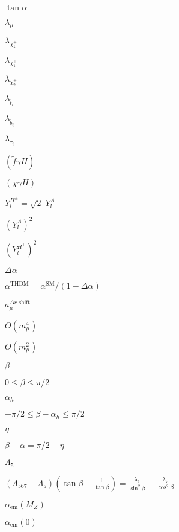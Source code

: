 \documentclass{article}
\begin{document}
$\tan\alpha$
\pagebreak

$\lambda_{\mu}$
\pagebreak

$\lambda_{\chi_k^+}$
\pagebreak

$\lambda_{\chi_1^+}$
\pagebreak

$\lambda_{\chi_2^+}$
\pagebreak

$\lambda_{\tilde{t}_i}$
\pagebreak

$\lambda_{\tilde{b}_i}$
\pagebreak

$\lambda_{\tilde{\tau}_i}$
\pagebreak

$(\tilde{f}\gamma H)$
\pagebreak

$(\chi\gamma H)$
\pagebreak

$Y_l^{H^\pm} = \sqrt{2}\; Y_l^A$
\pagebreak

$(Y_l^A)^2$
\pagebreak

$(Y_l^{H^\pm})^2$
\pagebreak

$\Delta\alpha$
\pagebreak

$\alpha^{\text{THDM}} = \alpha^{\text{SM}}/(1 - \Delta\alpha)$
\pagebreak

$a_\mu^{\Delta r\text{-shift}}$
\pagebreak

$O(m_\mu^4)$
\pagebreak

$O(m_\mu^2)$
\pagebreak

$\beta$
\pagebreak

$0 \leq \beta \leq \pi/2$
\pagebreak

$\alpha_h$
\pagebreak

$-\pi/2 \leq \beta - \alpha_h \leq \pi/2$
\pagebreak

$\eta$
\pagebreak

$\beta - \alpha = \pi/2 - \eta$
\pagebreak

$\Lambda_5$
\pagebreak

$\left(\Lambda_{567} - \Lambda_{5}\right)\left(\tan\beta - \frac{1}{\tan\beta}\right) = \frac{\lambda_6}{\sin^2\beta} - \frac{\lambda_7}{\cos^2\beta}$
\pagebreak

$\alpha_{\text{em}}(M_Z)$
\pagebreak

$\alpha_{\text{em}}(0)$
\pagebreak
\end{document}
